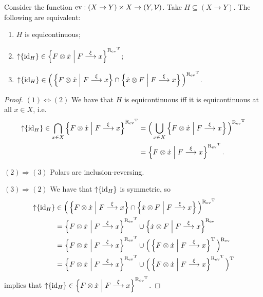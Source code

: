 \begin{lemma}
Consider the function $\operatorname{ev}: (X\to Y)\times X \to \left( Y,\mathcal{V} \right)$. Take $H\subseteq (X\to Y)$. The following are equivalent:
\begin{enumerate}
\item $H$ is equicontinuous;
\item $\operatorname{\uparrow}\{\operatorname{id}_H\} \in \left\{ F\otimes \dot{x} \;\middle|\; F\overset{\xi}{\longrightarrow}x \right\}^{\mathrel{\mathrm{R}_{\operatorname{ev}}}^{\mathrm{T}}}$;
\item $\operatorname{\uparrow}\{\operatorname{id}_H\} \in \Big(\left\{ F\otimes \dot{x} \;\middle|\; F\overset{\xi}{\longrightarrow}x \right\} \cap \left\{ \dot{x}\otimes F \;\middle|\; F\overset{\xi}{\longrightarrow}x \right\}\Big)^{\mathrel{\mathrm{R}_{\operatorname{ev}}}^{\mathrm{T}}}$.
\end{enumerate}
\end{lemma}
\begin{proof}
$(1) \Leftrightarrow (2)$ We have that $H$ is equicontinuous iff it is equicontinuous at all $x\in X$, i.e.\
\begin{align*}
\operatorname{\uparrow}\{\operatorname{id}_H\}\in \bigcap_{x\in X}\left\{ F\otimes \dot{x} \;\middle|\; F\overset{\xi}{\longrightarrow}x \right\}^{\mathrel{\mathrm{R}_{\operatorname{ev}}}^{\mathrm{T}}} &= \Big(\bigcup_{x\in X}\left\{ F\otimes \dot{x} \;\middle|\; F\overset{\xi}{\longrightarrow}x \right\}\Big)^{\mathrel{\mathrm{R}_{\operatorname{ev}}}^{\mathrm{T}}} \\
&= \left\{ F\otimes \dot{x} \;\middle|\; F\overset{\xi}{\longrightarrow}x \right\}^{\mathrel{\mathrm{R}_{\operatorname{ev}}}^{\mathrm{T}}}.
\end{align*}

$(2) \Rightarrow (3)$ Polars are inclusion-reversing.

$(3) \Rightarrow (2)$ We have that $\operatorname{\uparrow}\{\operatorname{id}_H\}$ is symmetric, so
\begin{align*}
\operatorname{\uparrow}\{\operatorname{id}_H\} &\in \Big(\left\{ F\otimes \dot{x} \;\middle|\; F\overset{\xi}{\longrightarrow}x \right\} \cap \left\{ \dot{x}\otimes F \;\middle|\; F\overset{\xi}{\longrightarrow}x \right\}\Big)^{\mathrel{\mathrm{R}_{\operatorname{ev}}}^{\mathrm{T}}} \\
&= \left\{ F\otimes \dot{x} \;\middle|\; F\overset{\xi}{\longrightarrow}x \right\}^{\mathrel{\mathrm{R}_{\operatorname{ev}}}^{\mathrm{T}}} \cup \left\{ \dot{x}\otimes F \;\middle|\; F\overset{\xi}{\longrightarrow}x \right\}^{\mathrel{\mathrm{R}_{\operatorname{ev}}}} \\
&= \left\{ F\otimes \dot{x} \;\middle|\; F\overset{\xi}{\longrightarrow}x \right\}^{\mathrel{\mathrm{R}_{\operatorname{ev}}}^{\mathrm{T}}} \cup \Big(\left\{ F\otimes\dot{x} \;\middle|\; F\overset{\xi}{\longrightarrow}x \right\}^{\mathrm{T}}\Big)^{\mathrel{\mathrm{R}_{\operatorname{ev}}}} \\
&= \left\{ F\otimes \dot{x} \;\middle|\; F\overset{\xi}{\longrightarrow}x \right\}^{\mathrel{\mathrm{R}_{\operatorname{ev}}}^{\mathrm{T}}} \cup \Big(\left\{ F\otimes\dot{x} \;\middle|\; F\overset{\xi}{\longrightarrow}x \right\}^{\mathrel{\mathrm{R}_{\operatorname{ev}}}^{\mathrm{T}}}\Big)^{\mathrm{T}}
\end{align*}
implies that $\operatorname{\uparrow}\{\operatorname{id}_H\} \in \left\{ F\otimes \dot{x} \;\middle|\; F\overset{\xi}{\longrightarrow}x \right\}^{\mathrel{\mathrm{R}_{\operatorname{ev}}}^{\mathrm{T}}}$.
\end{proof}


